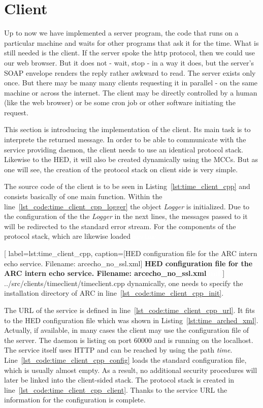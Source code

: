 \section{Client}

Up to now we have implemented a server program, the code that runs on a particular machine and waits for other programs that ask it for the time. What is still needed is the client. If the server spoke the http protocol, then we could use our web browser. But it does not - wait, stop - in a way it does, but the server's SOAP envelope renders the reply rather awkward to read.   The server exists only once. But there may be many many clients requesting it in parallel - on the same machine or across the internet. The client may be directly controlled by a human (like the web browser) or be some cron job or other software initiating the request.

This section is introducing the implementation of the client.
Its main task is to interprete the returned message.
In order to be able to communicate with the service providing daemon, the client needs to use an identical protocol stack.
Likewise to the HED, it will also be created dynamically using the MCCs.
But as one will see, the creation of the protocol stack on client side is very simple.

The source code of the client is to be seen in Listing~\ref{lst:time_client_cpp} and consists basically of one main function.
Within the line~\ref{lst_code:time_client_cpp_logger} the object \textit{Logger} is initialized.
Due to the configuration of the the \textit{Logger} in the next lines, the messages passed to it will be redirected to the standard error stream.  For the components of the protocol stack, which  are likewise loaded \textcolor{white}{newline}

	[
	label=lst:time_client_cpp,
	caption={[HED configuration file for the ARC intern echo service. Filename: arcecho\_no\_ssl.xml]
	\textbf{HED configuration file for the ARC intern echo service. Filename: arcecho\_no\_ssl.xml\textcolor{white}{hmf}}}
	]
{../src/clients/timeclient/timeclient.cpp}
 dynamically, one needs to specify the installation directory of ARC in line~\ref{lst_code:time_client_cpp_init}.

The URL of the service is defined in line~\ref{lst_code:time_client_cpp_url}.
It fits to the HED configuration file which was shown in Listing~\ref{lst:time_arched_xml}.
Actually, if available, in many cases the client may use the configuration file of the server. 
The daemon is listing on port 60000 and is running on the localhost. The service itself uses HTTP and can be reached by using the path \textit{time}.
Line~\ref{lst_code:time_client_cpp_config} loads the standard configuration file, which is usually almost empty.
As a result, no additional security procedures will later be linked into the client-sided stack. 
The protocol stack is created in line~\ref{lst_code:time_client_cpp_client}. 
Thanks to the service URL the information for the configuration is complete.


